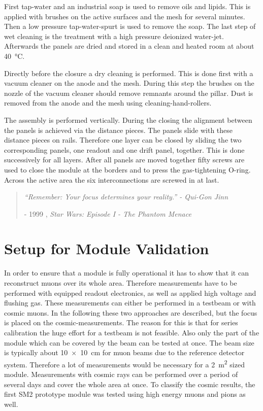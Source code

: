 \documentclass[
twoside,            %
BCOR1.4cm,          %
10pt,               %
headings=normal,    %
headsepline,        %
clearplainpage,		%
final,              %
div=14,
open=right,
bibliography=toc
]{scrreprt}
\begin{document}
First tap-water and an industrial soap is used to remove oils and lipids.
This is applied with brushes on the active surfaces and the mesh for several minutes.
Then a low pressure tap-water-spurt is used to remove the soap.
The last step of wet cleaning is the treatment with a high pressure deionized water-jet.
Afterwards the panels are dried and stored in a clean and heated room at about \SI{40}{\degreeCelsius}.

Directly before the closure a dry cleaning is performed.
This is done first with a vacuum cleaner on the anode and the mesh.
During this step the brushes on the nozzle of the vacuum cleaner should remove remnants around the pillar.
Dust is removed from the anode and the mesh using cleaning-hand-rollers.

The assembly is performed vertically.
During the closing the alignment between the panels is achieved via the distance pieces.
The panels slide with these distance pieces on rails.
Therefore one layer can be closed by sliding the two corresponding panels, one readout and one drift panel, together.
This is done successively for all layers.
After all panels are moved together fifty screws are used to close the module at the borders and to press the gas-tightening O-ring. 
Across the active area the six interconnections are screwed in at last.

\vspace*{\fill} 
\begin{quote} 
	\textit{
		``Remember: Your focus determines your reality.'' - Qui-Gon Jinn
	}
	
	\hfill - 1999 , \textit{Star Wars: Episode I - The Phantom Menace}
\end{quote}
\vspace*{\fill}

\chapter{Setup for Module Validation}

In order to ensure that a module is fully operational it has to show that it can reconstruct muons over its whole area.
Therefore measurements have to be performed with equipped readout electronics, as well as applied high voltage and flushing gas.
These measurements can either be performed in a testbeam or with cosmic muons.
In the following these two approaches are described, but the focus is placed on the cosmic-measurements.
The reason for this is that for series calibration the huge effort for a testbeam is not feasible. 
Also only the part of the module which can be covered by the beam can be tested at once.
The beam size is typically about \SI[product-units = repeat]{10 x 10}{cm} for muon beams due to the reference detector system. 
Therefore a lot of measurements would be necessary for a \SI{2}{\square m} sized module. 
Measurements with cosmic rays can be performed over a period of several days and cover the whole area at once.
To classify the cosmic results, the first SM2 prototype module was tested using high energy muons and pions as well.
\end{document}
